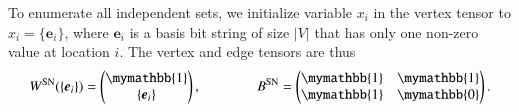\documentclass[onefignum, onetabnum]{siamart190516}
\newcommand{\<}{\langle}
\renewcommand{\>}{\rangle}
\begin{document}
To enumerate all independent sets, 
we initialize variable $x_{i}$ in the vertex tensor to $x_i = \{\boldsymbol{e}_{i}\}$, where $\boldsymbol{e}_i$ is a basis bit string of size $|V|$ that has only one non-zero value at location $i$.
The vertex and edge tensors are thus
\begin{equation}
    W^{\rm SN}(\{\boldsymbol{e}_{i}\}) = \left(\begin{matrix}
        \mymathbb{1} \\
        \{\boldsymbol{e}_{i}\}
    \end{matrix}\right),   
    \qquad \qquad
        B^{\rm SN} = \left(\begin{matrix}
        \mymathbb{1}  & \mymathbb{1} \\
        \mymathbb{1} & \mymathbb{0}
    \end{matrix}\right).
\end{equation}
\end{document}
